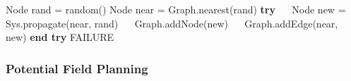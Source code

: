 \documentclass[a4paper]{article}
\begin{document}
\begin{itemize}
\begin{itemize}
\begin{itemize}
\begin{algorithmic}
                                \STATE Node rand = random()
                                \STATE Node near = Graph.nearest(rand)
                                \STATE \textbf{try}
                                \STATE $\quad$ Node new = Sys.propagate(near, rand)
                                \STATE $\quad$ Graph.addNode(new)
                                \STATE $\quad$ Graph.addEdge(near, new)
                                \STATE \textbf{end try}
                            \ENDWHILE
                            \RETURN FAILURE
                        \end{algorithmic}
                \end{itemize}
        \end{itemize}
\end{itemize}

\subsubsection{Potential Field Planning}
\end{document}

